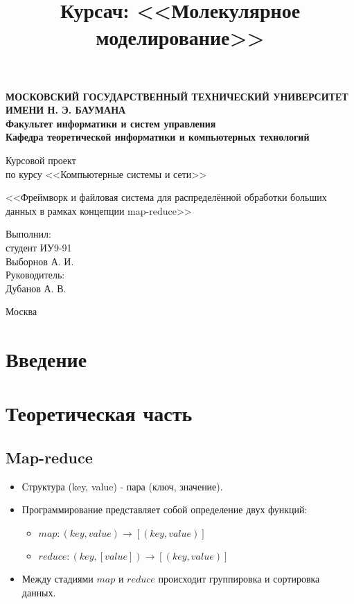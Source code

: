 \documentclass[12pt,a4paper,oneside]{extarticle}
\title{Курсач: <<Молекулярное моделирование>>}
\begin{document}
\pgfplotsset{compat=1.8}

\thispagestyle{empty}
\newpage
{
\centering


\textbf{
МОСКОВСКИЙ ГОСУДАРСТВЕННЫЙ ТЕХНИЧЕСКИЙ УНИВЕРСИТЕТ ИМЕНИ Н. Э. БАУМАНА \\
Факультет информатики и систем управления \\
Кафедра теоретической информатики и компьютерных технологий}
\bigskip
\bigskip
\bigskip
\bigskip
\bigskip
\bigskip
\bigskip

\vfill


Курсовой проект \\
по курсу <<Компьютерные системы и сети>>

\bigskip

{\large <<Фреймворк и файловая система для распределённой обработки больших данных в рамках концепции map-reduce>>}
\bigskip

\vfill



\hfill\parbox{4cm} {
Выполнил:\\
студент ИУ9-91 \hfill \\
Выборнов А. И.\hfill \medskip\\
Руководитель:\\
Дубанов А. В.\hfill
}


\vspace{\fill}

Москва \number\year
\clearpage
}


\tableofcontents

\clearpage


\section*{Введение}
   
\clearpage

\section{Теоретическая часть}
    \subsection{Map-reduce}
        \begin{itemize}
            \item Структура (key, value) - пара (ключ, значение).
            \item Программирование представляет собой определение двух функций:
            \begin{itemize}
                \item $map: (key, value)\rightarrow[(key, value)]$
                \item $reduce: (key, [value])\rightarrow[(key, value)]$
            \end{itemize}
            \item Между стадиями $map$ и $reduce$ происходит группировка и сортировка данных.
        \end{itemize}
\end{document}
